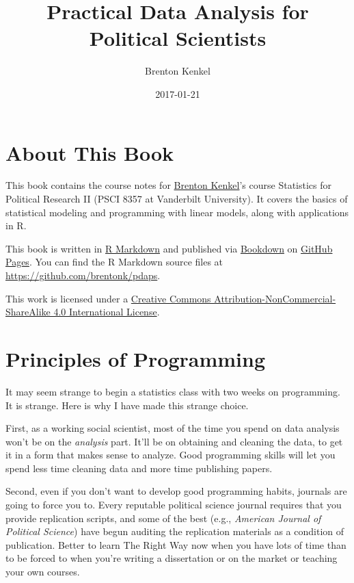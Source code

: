 \documentclass[12pt,oneside,openany]{book}
\title{Practical Data Analysis for Political Scientists}
\author{Brenton Kenkel}
\date{2017-01-21}
\begin{document}
\maketitle

{
\setcounter{tocdepth}{1}
\tableofcontents
}
\chapter{About This Book}\label{about-this-book}

This book contains the course notes for
\href{http://bkenkel.com}{Brenton Kenkel}'s course Statistics for
Political Research II (PSCI 8357 at Vanderbilt University). It covers
the basics of statistical modeling and programming with linear models,
along with applications in R.

This book is written in \href{http://rmarkdown.rstudio.com}{R Markdown}
and published via \href{https://bookdown.org}{Bookdown} on
\href{https://pages.github.com}{GitHub Pages}. You can find the R
Markdown source files at \url{https://github.com/brentonk/pdaps}.

This work is licensed under a
\href{http://creativecommons.org/licenses/by-nc-sa/4.0/}{Creative
Commons Attribution-NonCommercial-ShareAlike 4.0 International License}.

\hypertarget{programming}{\chapter{Principles of
Programming}\label{programming}}

It may seem strange to begin a statistics class with two weeks on
programming. It is strange. Here is why I have made this strange choice.

First, as a working social scientist, most of the time you spend on data
analysis won't be on the \emph{analysis} part. It'll be on obtaining and
cleaning the data, to get it in a form that makes sense to analyze. Good
programming skills will let you spend less time cleaning data and more
time publishing papers.

Second, even if you don't want to develop good programming habits,
journals are going to force you to. Every reputable political science
journal requires that you provide replication scripts, and some of the
best (e.g., \emph{American Journal of Political Science}) have begun
auditing the replication materials as a condition of publication. Better
to learn The Right Way now when you have lots of time than to be forced
to when you're writing a dissertation or on the market or teaching your
own courses.
\end{document}
